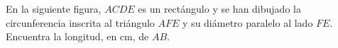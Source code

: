 En la siguiente figura, $ACDE$ es un rectángulo y se han dibujado la circunferencia inscrita al triángulo $AFE$ y su diámetro paralelo al lado $FE$. Encuentra la longitud, en cm, de $AB$.